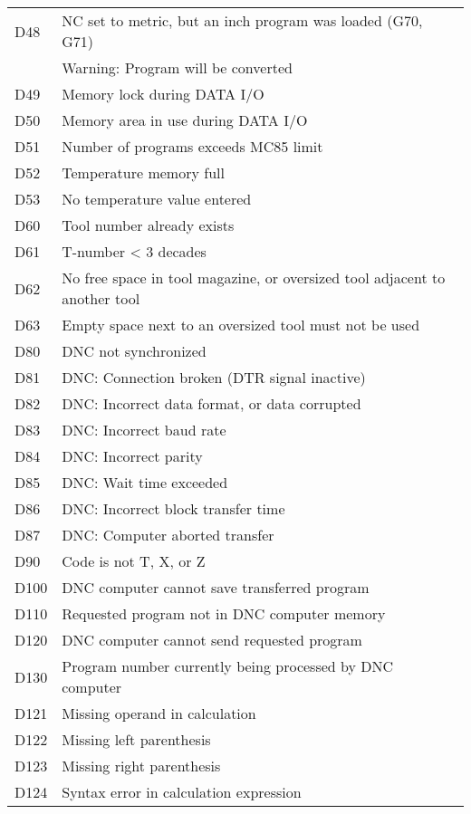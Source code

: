\documentclass[openany,11pt]{book}
\begin{document}
\begin{table}[!h]
    \begin{tabular}{ll}
    D48 & NC set to metric, but an inch program was loaded (G70, G71) \\
        & Warning: Program will be converted \\
    D49 & Memory lock during DATA I/O \\
    D50 & Memory area in use during DATA I/O \\
    D51 & Number of programs exceeds MC85 limit \\
    D52 & Temperature memory full \\
    D53 & No temperature value entered \\
    D60 & Tool number already exists \\
    D61 & T-number < 3 decades \\
    D62 & No free space in tool magazine, or oversized tool adjacent to another tool \\
    D63 & Empty space next to an oversized tool must not be used \\
    D80 & DNC not synchronized \\
    D81 & DNC: Connection broken (DTR signal inactive) \\
    D82 & DNC: Incorrect data format, or data corrupted \\
    D83 & DNC: Incorrect baud rate \\
    D84 & DNC: Incorrect parity \\
    D85 & DNC: Wait time exceeded \\
    D86 & DNC: Incorrect block transfer time \\
    D87 & DNC: Computer aborted transfer \\
    D90 & Code is not T, X, or Z \\
    D100 & DNC computer cannot save transferred program \\
    D110 & Requested program not in DNC computer memory \\
    D120 & DNC computer cannot send requested program \\
    D130 & Program number currently being processed by DNC computer \\
    D121 & Missing operand in calculation \\
    D122 & Missing left parenthesis \\
    D123 & Missing right parenthesis \\
    D124 & Syntax error in calculation expression \\

\end{tabular}
\end{table}
\end{document}
